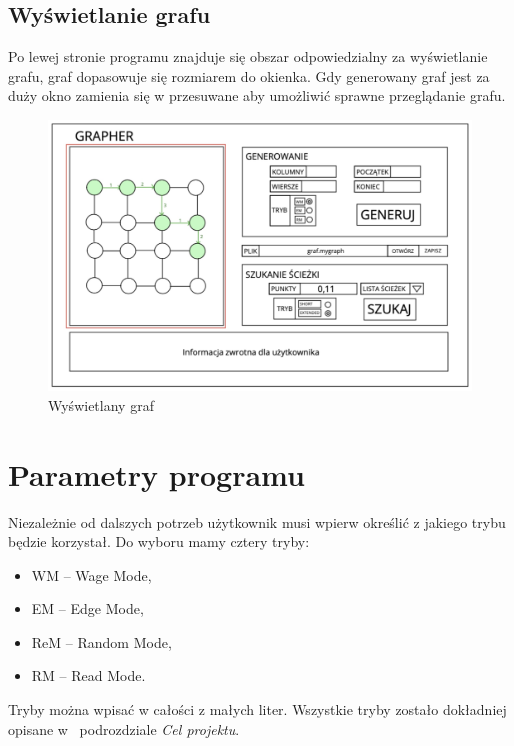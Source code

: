 \documentclass[10pt, a4paper]{report}
\begin{document}
    \subsection{Wyświetlanie grafu}
    Po lewej stronie programu znajduje się obszar odpowiedzialny za wyświetlanie grafu, graf dopasowuje się rozmiarem do okienka.
    Gdy generowany graf jest za duży okno zamienia się w przesuwane aby umożliwić sprawne przeglądanie grafu.
    \begin{figure}[ht]
      \begin{center}
          \includegraphics[scale=0.19]{gui_graph.jpg}
          \caption{Wyświetlany graf}
      \end{center}
    \end{figure}
    \newpage

    \section{Parametry programu}
    Niezależnie od dalszych potrzeb użytkownik musi wpierw określić z jakiego trybu będzie korzystał. Do wyboru mamy cztery tryby:
    \begin{itemize}
      \item WM -- Wage Mode,
      \item EM -- Edge Mode,
      \item ReM -- Random Mode,
      \item RM -- Read Mode.
    \end{itemize}
    Tryby można wpisać w całości z małych liter. Wszystkie tryby zostało dokładniej opisane w~ podrozdziale \textit{Cel projektu}.
    \newpage
\end{document}
